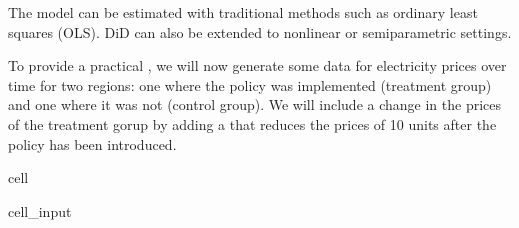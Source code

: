\documentclass[letterpaper,10pt,english]{jupyterBook}
\begin{document}
\sphinxAtStartPar
The model can be estimated with traditional methods such as ordinary least squares (OLS). DiD can also be extended to nonlinear or semi\sphinxhyphen{}parametric settings.

\sphinxAtStartPar
To provide a practical , we will now generate some data for electricity prices over time for two regions: one where the policy was implemented (treatment group) and one where it was not (control group). We will include a change in the prices of the treatment gorup by adding a  that reduces the prices of 10 units after the policy has been introduced.

\begin{sphinxuseclass}{cell}\begin{sphinxVerbatimInput}

\begin{sphinxuseclass}{cell_input}
\begin{sphinxVerbatim}[commandchars=\\\{\}]
   
   


  
  
    

       

         
\PYG{p}{[}\PYG{p}{]}    


\end{sphinxVerbatim}
\end{sphinxuseclass}
\end{sphinxVerbatimInput}
\end{sphinxuseclass}
\end{document}
